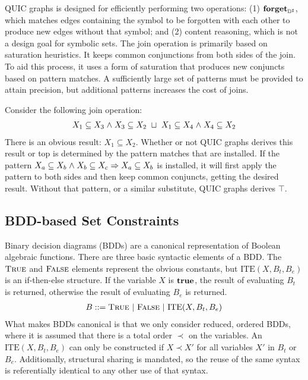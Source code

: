 QUIC graphs is designed for efficiently performing two operations: (1) $\textbf{forget}_{{\mathbb{D}}^{\sharp}}$, which matches edges containing the symbol to be forgotten with each other to produce new edges without that symbol; and (2) content reasoning, which is not a design goal for symbolic sets.  The join operation is primarily based on saturation heuristics.  It keeps common conjunctions from both sides of the join.  To aid this process, it uses a form of saturation that produces new conjuncts based on pattern matches.  A sufficiently large set of patterns must be provided to attain precision, but additional patterns increases the cost of joins.
\begin{example}  Consider the following join operation:
    \begin{align*}
      X_1 \subseteq X_3 \mathrel{\wedge} X_3 \subseteq X_2 \ \sqcup \ X_1 \subseteq X_4 \mathrel{\wedge} X_4 \subseteq X_2
    \end{align*}
    There is an obvious result: $X_1 \subseteq X_2$.  Whether or not QUIC graphs derives this result or top is determined by the pattern matches that are installed.  If the pattern $X_a \subseteq X_b \mathrel{\wedge} X_b \subseteq X_c \Rightarrow X_a \subseteq X_b$ is installed, it will first apply the pattern to both sides and then keep common conjuncts, getting the desired result.  Without that pattern, or a similar substitute, QUIC graphs derives $\top$.
\end{example}

\subsection{BDD-based Set Constraints}
\label{s:4:3:bdd}
Binary decision diagrams (BDDs) are a canonical representation of Boolean algebraic functions.  There are three basic syntactic elements of a BDD.  The $\textsc{True}$ and $\textsc{False}$ elements represent the obvious constants, but $\textrm{ITE}(X,B_t,B_e)$ is an if-then-else structure.  If the variable $X$ is $\mathbf{true}$, the result of evaluating $B_t$ is returned, otherwise the result of evaluating $B_e$ is returned.
\begin{align*}
  B ::= \textsc{True} \ | \ \textsc{False} \ | \ \textrm{ITE}(X,B_t,B_e)
\end{align*}
What makes BDDs canonical is that we only consider reduced, ordered BDDs, where it is assumed that there is a total order $\prec$ on the variables.  An $\textrm{ITE}(X,B_t,B_e)$ can only be constructed if $X \prec X'$ for all variables $X'$ in $B_t$ or $B_e$.  Additionally, structural sharing is mandated, so the reuse of the same syntax is referentially identical to any other use of that syntax.

